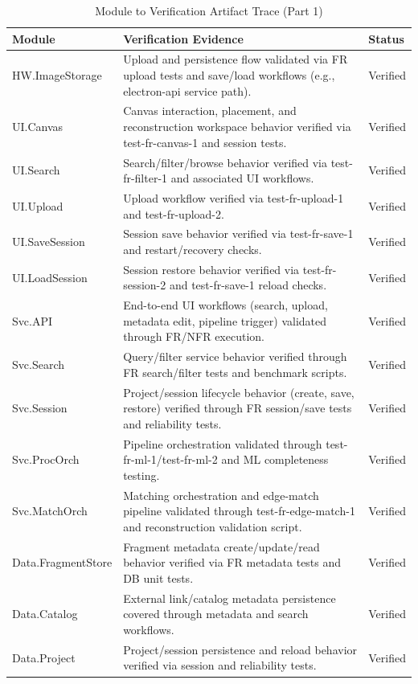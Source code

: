 \documentclass[12pt, titlepage]{article}
\begin{document}
\begin{table}[H]
\centering
\scriptsize
\setlength{\tabcolsep}{2pt}
\renewcommand{\arraystretch}{1.0}
\caption{Module to Verification Artifact Trace (Part 1)}
\begin{tabularx}{\textwidth}{p{3.3cm}X p{1.1cm}}
\toprule
\textbf{Module} & \textbf{Verification Evidence} & \textbf{Status}\\
\midrule
HW.ImageStorage & Upload and persistence flow validated via FR upload tests and save/load workflows (e.g., electron-api service path). & Verified\\
UI.Canvas & Canvas interaction, placement, and reconstruction workspace behavior verified via test-fr-canvas-1 and session tests. & Verified\\
UI.Search & Search/filter/browse behavior verified via test-fr-filter-1 and associated UI workflows. & Verified\\
UI.Upload & Upload workflow verified via test-fr-upload-1 and test-fr-upload-2. & Verified\\
UI.SaveSession & Session save behavior verified via test-fr-save-1 and restart/recovery checks. & Verified\\
UI.LoadSession & Session restore behavior verified via test-fr-session-2 and test-fr-save-1 reload checks. & Verified\\
Svc.API & End-to-end UI workflows (search, upload, metadata edit, pipeline trigger) validated through FR/NFR execution. & Verified\\
Svc.Search & Query/filter service behavior verified through FR search/filter tests and benchmark scripts. & Verified\\
Svc.Session & Project/session lifecycle behavior (create, save, restore) verified through FR session/save tests and reliability tests. & Verified\\
Svc.ProcOrch & Pipeline orchestration validated through test-fr-ml-1/test-fr-ml-2 and ML completeness testing. & Verified\\
Svc.MatchOrch & Matching orchestration and edge-match pipeline validated through test-fr-edge-match-1 and reconstruction validation script. & Verified\\
Data.FragmentStore & Fragment metadata create/update/read behavior verified via FR metadata tests and DB unit tests. & Verified\\
Data.Catalog & External link/catalog metadata persistence covered through metadata and search workflows. & Verified\\
Data.Project & Project/session persistence and reload behavior verified via session and reliability tests. & Verified\\
\bottomrule
\end{tabularx}
\end{table}
\end{document}
